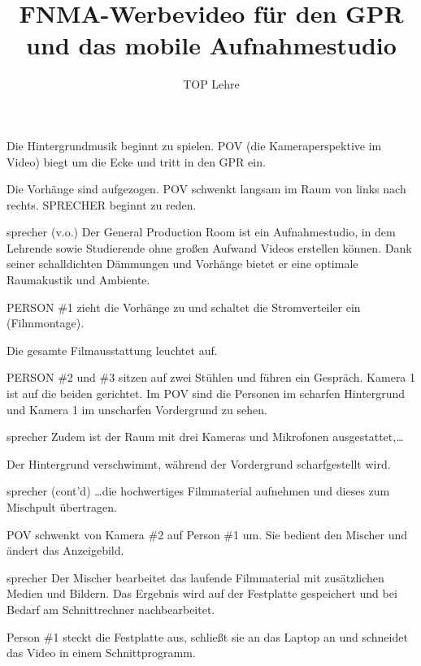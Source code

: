\documentclass{screenplay}
\title{
	FNMA-Werbevideo für den GPR\\
	und das mobile Aufnahmestudio
}
\author{TOP Lehre}
\begin{document}
	\coverpage
	\fadein
	
	
	Die Hintergrundmusik beginnt zu spielen. POV (die Kameraperspektive im Video) biegt um die Ecke und tritt in den GPR ein.
	
	
	Die Vorhänge sind aufgezogen. POV schwenkt langsam im Raum von links nach rechts. SPRECHER beginnt zu reden.
	
	\begin{dialogue}[nüchtern]{sprecher (v.o.)}
		Der General Production Room ist ein Aufnahmestudio, in dem Lehrende sowie Studierende ohne großen Aufwand Videos erstellen können. Dank seiner schalldichten Dämmungen und Vorhänge bietet er eine optimale Raumakustik und Ambiente.
	\end{dialogue}
	
	PERSON \#1 zieht die Vorhänge zu und schaltet die Stromverteiler ein (Filmmontage).
	
	Die gesamte Filmausstattung leuchtet auf.
	
	PERSON \#2 und \#3 sitzen auf zwei Stühlen und führen ein Gespräch. Kamera 1 ist auf die beiden gerichtet. Im POV sind die Personen im scharfen Hintergrund und Kamera 1 im unscharfen Vordergrund zu sehen.
	
	\begin{dialogue}{sprecher}
		Zudem ist der Raum mit drei Kameras und Mikrofonen ausgestattet,\dots
	\end{dialogue}
	
	Der Hintergrund verschwimmt, während der Vordergrund scharfgestellt wird.
	
	\begin{dialogue}{sprecher (cont'd)}
		\dots die hochwertiges Filmmaterial aufnehmen und dieses zum Mischpult übertragen.
	\end{dialogue}
	
	POV schwenkt von Kamera \#2 auf Person \#1 um. Sie bedient den Mischer und ändert das Anzeigebild.
	
	\begin{dialogue}{sprecher}
		Der Mischer bearbeitet das laufende Filmmaterial mit zusätzlichen Medien und Bildern. Das Ergebnis wird auf der Festplatte gespeichert und bei Bedarf am Schnittrechner nachbearbeitet.
	\end{dialogue}
	
	Person \#1 steckt die Festplatte aus, schließt sie an das Laptop an und schneidet das Video in einem Schnittprogramm.
	
\end{document}
